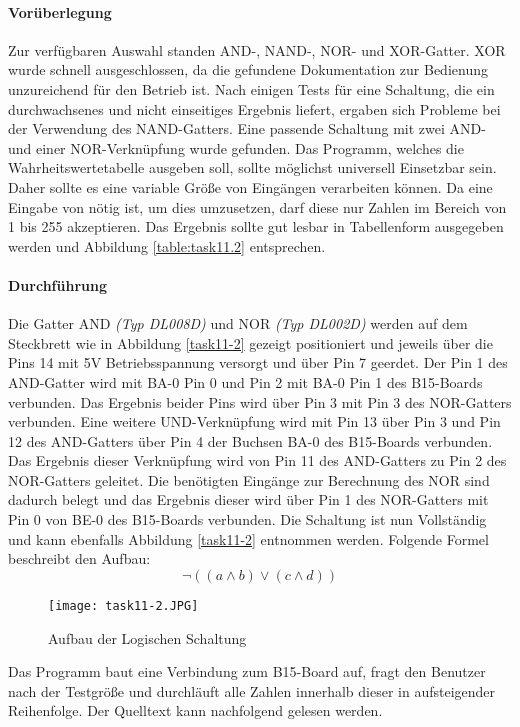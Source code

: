 \paragraph{Vorüberlegung}
Zur verfügbaren Auswahl standen AND-, NAND-, NOR- und XOR-Gatter. XOR wurde schnell ausgeschlossen, da die gefundene Dokumentation zur Bedienung unzureichend für den Betrieb ist. Nach einigen Tests für eine Schaltung, die ein durchwachsenes und nicht einseitiges Ergebnis liefert, ergaben sich Probleme bei der Verwendung des NAND-Gatters. Eine passende Schaltung mit zwei AND- und einer NOR-Verknüpfung wurde gefunden. Das Programm, welches die Wahrheitswertetabelle ausgeben soll, sollte möglichst universell Einsetzbar sein. Daher sollte es eine variable Größe von Eingängen verarbeiten können. Da eine Eingabe von nötig ist, um dies umzusetzen, darf diese nur Zahlen im Bereich von 1 bis 255 akzeptieren. Das Ergebnis sollte gut lesbar in Tabellenform ausgegeben werden und Abbildung \vref{table:task11.2} entsprechen.

\paragraph{Durchführung}
Die Gatter AND \textit{(Typ DL008D)} und NOR \textit{(Typ DL002D)} werden auf dem Steckbrett wie in Abbildung \vref{task11-2} gezeigt positioniert und jeweils über die Pins 14 mit 5V Betriebsspannung versorgt und über Pin 7 geerdet. Der Pin 1 des AND-Gatter wird mit BA-0 Pin 0 und Pin 2 mit BA-0 Pin 1 des B15-Boards verbunden. Das Ergebnis beider Pins wird über Pin 3 mit Pin 3 des NOR-Gatters verbunden. Eine weitere UND-Verknüpfung wird mit Pin 13 über Pin 3 und Pin 12 des AND-Gatters über Pin 4 der Buchsen BA-0 des B15-Boards verbunden. Das Ergebnis dieser Verknüpfung wird von Pin 11 des AND-Gatters zu Pin 2 des NOR-Gatters geleitet. Die benötigten Eingänge zur Berechnung des NOR sind dadurch belegt und das Ergebnis dieser wird über Pin 1 des NOR-Gatters mit Pin 0 von BE-0 des B15-Boards verbunden. Die Schaltung ist nun Vollständig und kann ebenfalls Abbildung \vref{task11-2} entnommen werden. Folgende Formel beschreibt den Aufbau:
\[\neg{((a \land b) \lor (c \land d))}\]

\begin{figure}
	\centering
	\texttt{[image: task11-2.JPG]}
	\caption{Aufbau der Logischen Schaltung}
	\label{task11-2}
\end{figure}

Das Programm baut eine Verbindung zum B15-Board auf, fragt den Benutzer nach der Testgröße und durchläuft alle Zahlen innerhalb dieser in aufsteigender Reihenfolge. Der Quelltext kann nachfolgend gelesen werden.

